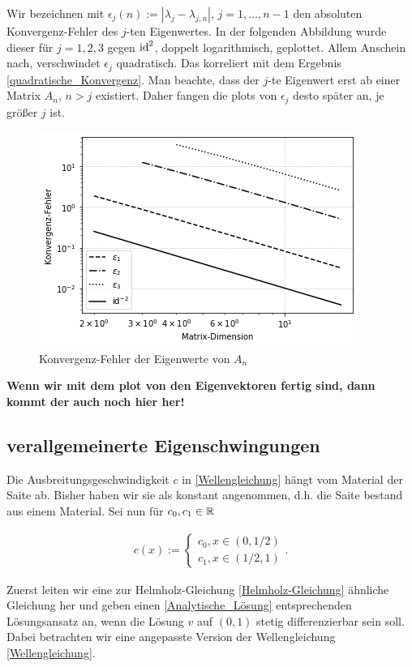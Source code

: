 Wir bezeichnen mit $\epsilon_j(n) := |\lambda_j - \lambda_{j, n}|$, $j = 1, \ldots, n-1$ den absoluten Konvergenz-Fehler des $j$-ten Eigenwertes. In der folgenden Abbildung wurde dieser für $j = 1, 2, 3$ gegen $\text{id}^2$, doppelt logarithmisch, geplottet. Allem Anschein nach, verschwindet $\epsilon_j$ quadratisch. Das korreliert mit dem Ergebnis \eqref{quadratische_Konvergenz}. Man beachte, dass der $j$-te Eigenwert erst ab einer Matrix $A_n$, $n > j$ existiert. Daher fangen die plots von $\epsilon_j$ desto später an, je größer $j$ ist.\\

\begin{figure}[h!]
  \centering
  \includegraphics[width = 0.5 \textwidth]{Aufgabe_2/Konvergenz-Fehler_der_Eigenwerte_von_A_n}
  \caption{Konvergenz-Fehler der Eigenwerte von $A_n$}
  \label{Konvergenz-Fehler_EW}
\end{figure}

\textbf{Wenn wir mit dem plot von den Eigenvektoren fertig sind, dann kommt der auch noch hier her!}

\subsection{verallgemeinerte Eigenschwingungen}

Die Ausbreitungsgeschwindigkeit $c$ in \eqref{Wellengleichung} hängt vom Material der Saite ab. Bisher haben wir sie als konstant angenommen, d.h. die Saite bestand aus einem Material. Sei nun für $c_0, c_1 \in \mathbb{R}$

\begin{align} \label{Material-Funktion}
  c(x) :=
  \begin{cases}
    c_0, x \in (0, 1/2) \\
    c_1, x \in (1/2, 1)
  \end{cases}.
\end{align}

Zuerst leiten wir eine zur Helmholz-Gleichung \eqref{Helmholz-Gleichung} ähnliche Gleichung her und geben einen \eqref{Analytische_Lösung} entsprechenden Lösungsansatz an, wenn die Lösung $v$ auf $(0, 1)$ stetig differenzierbar sein soll.
Dabei betrachten wir eine angepasste Version der Wellengleichung \eqref{Wellengleichung}.

